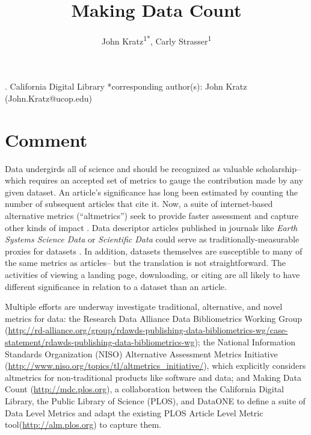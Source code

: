\documentclass[english]{article}
\begin{document}
\title{Making Data Count}


\author{John Kratz\textsuperscript{1{*}}, Carly Strasser\textsuperscript{1}}

. California Digital Library 
{*}corresponding author(s): John Kratz (John.Kratz@ucop.edu)


\section*{Comment}


Data undergirds all of science and should be recognized as valuable scholarship-- which requires an accepted set of metrics to gauge the contribution made by any given dataset.
An article's significance has long been estimated by counting the number of subsequent articles that cite it. 
Now, a suite of internet-based alternative metrics (``altmetrics'') seek to provide faster assessment and capture other kinds of impact \cite{priem_altmetrics_2012}.
Data descriptor articles published in journals like \textit{Earth Systems Science Data} or \textit{Scientific Data} could serve as traditionally-measurable proxies for datasets \cite{pfeiffenberger_earth_2011, editors_more_2014}.
In addition, datasets themselves are susceptible to many of the same metrics as articles-- but the translation is not straightforward.
The activities of viewing a landing page, downloading, or citing are all likely to have different significance in relation to a dataset than an article.

Multiple efforts are underway investigate traditional, alternative, and novel metrics for data: the Research Data Alliance Data Bibliometrics Working Group (\url{http://rd-alliance.org/group/rdawds-publishing-data-bibliometrics-wg/case-statement/rdawds-publishing-data-bibliometrics-wg}{}); the National Information Standards Organization (NISO) Alternative Assessment Metrics Initiative (\url{http://www.niso.org/topics/tl/altmetrics_initiative/}), which explicitly considers altmetrics for non-traditional products like software and data; and Making Data Count (\url{http://mdc.plos.org}), a collaboration between the California Digital Library, the Public Library of Science (PLOS), and DataONE to define a suite of Data Level Metrics  and adapt the existing PLOS Article Level Metric tool(\url{http://alm.plos.org}) to capture them.
\end{document}
